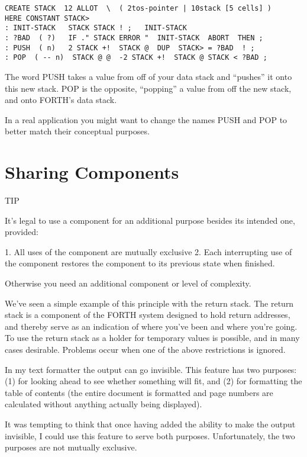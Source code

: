 \begin{verbatim}
CREATE STACK  12 ALLOT  \  ( 2tos-pointer | 10stack [5 cells] )
HERE CONSTANT STACK>
: INIT-STACK   STACK STACK ! ;   INIT-STACK
: ?BAD  ( ?)   IF ." STACK ERROR "  INIT-STACK  ABORT  THEN ;
: PUSH  ( n)   2 STACK +!  STACK @  DUP  STACK> = ?BAD  ! ;
: POP  ( -- n)  STACK @ @  -2 STACK +!  STACK @ STACK < ?BAD ;
\end{verbatim}

The word PUSH takes a value from off of your data stack and ``pushes''
it onto this new stack. POP is the opposite, ``popping'' a value from off
the new stack, and onto FORTH's data stack.

In a real application you might want to change the names PUSH
and POP to better match their conceptual purposes.

\section{Sharing Components}

TIP

It's legal to use a component for an additional purpose besides its intended
one, provided:

1. All uses of the component are mutually exclusive
2. Each interrupting use of the component restores the component to
   its previous state when finished.

Otherwise you need an additional component or level of complexity.

We've seen a simple example of this principle with the return stack. The
return stack is a component of the FORTH system designed to hold
return addresses, and thereby serve as an indication of where you've been
and where you're going. To use the return stack as a holder for temporary
values is possible, and in many cases desirable. Problems occur when one
of the above restrictions is ignored.

In my text formatter the output can go invisible. This feature has
two purposes: (1) for looking ahead to see whether something will fit, and
(2) for formatting the table of contents (the entire document is formatted
and page numbers are calculated without anything actually being
displayed).

It was tempting to think that once having added the ability to make
the output invisible, I could use this feature to serve both purposes.
Unfortunately, the two purposes are not mutually exclusive.

